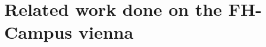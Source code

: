 \section{Related work done on the FH-Campus vienna}
\label{sec:related-work-done-on-the-fh-campus-vienna}
